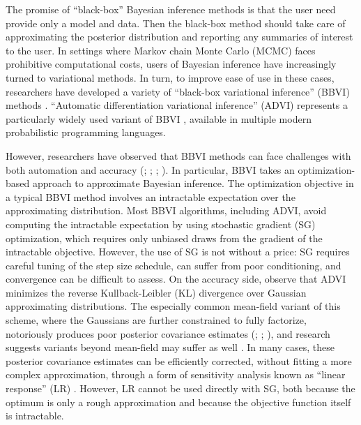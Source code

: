 The promise of ``black-box'' Bayesian inference methods is that the user need
provide only a model and data. Then the black-box method should take care of
approximating the posterior distribution and reporting any summaries of interest
to the user. In settings where Markov chain Monte Carlo (MCMC) faces prohibitive
computational costs, users of Bayesian inference have increasingly turned to
variational methods. In turn, to improve ease of use in these cases, researchers
have developed a variety of ``black-box variational inference'' (BBVI) methods
\citep{ranganath:2014:bbvi, blei:2016:variational}. ``Automatic differentiation
variational inference'' (ADVI) represents a particularly widely used variant of
BBVI \citep{kucukelbir:2017:advi}, available in multiple modern probabilistic
programming languages.

However, researchers have observed that BBVI methods can face challenges with
both automation \citep{dhaka:2020:robuststochasticvi, welandawe:2022:robustbbvi}
and accuracy (\citealp[][Exercise 33.5]{mackay:2003:information};
\citealp[][Chapter 10.1.2]{bishop:2006:pattern}; \citealp{turner:2011:two};
\citealp[][Propositions 3.1--3.3]{huggins:2020:validated}). In particular, BBVI
takes an optimization-based approach to approximate Bayesian inference. The
optimization objective in a typical BBVI method involves an intractable
expectation over the approximating distribution. Most BBVI algorithms, including
ADVI, avoid computing the intractable expectation by using stochastic gradient
(SG) optimization, which requires only unbiased draws from the gradient of the
intractable objective. However, the use of SG is not without a price: SG
requires careful tuning of the step size schedule, can suffer from poor
conditioning, and convergence can be difficult to assess. On the accuracy side,
observe that ADVI minimizes the reverse Kullback-Leibler (KL) divergence over
Gaussian approximating distributions. The especially common mean-field variant
of this scheme, where the Gaussians are further constrained to fully factorize,
notoriously produces poor posterior covariance estimates (\citealp[][Exercise
33.5]{mackay:2003:information}; \citealp[][Chapter 10.1.2]{bishop:2006:pattern};
\citealp{turner:2011:two}), and research suggests variants beyond mean-field may
suffer as well \citep[][Proposition 3.2]{huggins:2020:validated}. In many cases,
these posterior covariance estimates can be efficiently corrected, without
fitting a more complex approximation, through a form of sensitivity analysis
known as ``linear response'' (LR) \citep{giordano:2015:lrvb,
giordano:2018:covariances}. However, LR cannot be used directly with SG, both
because the optimum is only a rough approximation and because the objective
function itself is intractable.

